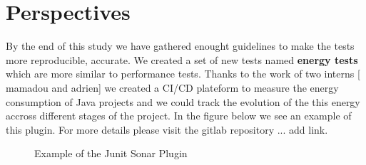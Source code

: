 \section{Perspectives}
By the end of this study we have gathered enought guidelines to make the tests more reproducible, accurate.
We created a set of new tests named \textbf{energy tests} which are more similar to performance tests. Thanks to the work of two interns [ mamadou and adrien] we created a CI/CD plateform to measure the energy consumption of Java projects and we could track the evolution of the this energy accross different stages of the project.
In the figure below we see an example of this plugin.
For more details please visit the gitlab repository ... add link.

\begin{figure}%
    \caption{Example of the Junit Sonar Plugin}\label{fig:sonar_plugin}
\end{figure}
